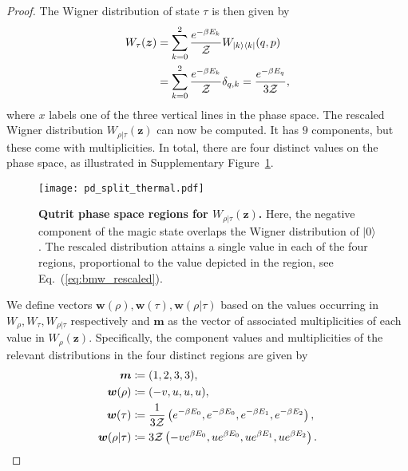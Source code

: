 \documentclass[
twocolumn,
superscriptaddress
]{revtex4-1}
\def\>{\rangle}
\def\<{\langle}
\def\z{\boldsymbol{z}}
\def\w{\boldsymbol{w}}
\def\m{\boldsymbol{m}}
\def\Z{{\cal Z}}
\begin{document}
\begin{proof}
The Wigner distribution of state $\tau$ is then given by
\begin{align}
	W_{\tau}(\z) &= \sum\limits_{k=0}^2 \frac{e^{-\beta E_k}}{\Z}W_{|k\>\<k|}(q, p) \nonumber\\
	&= \sum\limits_{k=0}^2 \frac{e^{-\beta E_k}}{\Z} \delta_{q, k} = \frac{e^{-\beta E_q}}{3\Z},
\end{align}
where $x$ labels one of the three vertical lines in the phase space.
The rescaled Wigner distribution $W_{\rho|\tau}(\z)$ can now be computed. It has $9$ components, but these come with multiplicities. In total, there are four distinct values on the phase space, as illustrated in Supplementary Figure~\ref{fig:pd_split}.
\begin{figure}[h]
    \centering
    \texttt{[image: pd\_split\_thermal.pdf]}
    \caption{\textbf{Qutrit phase space regions for $W_{\rho | \tau}(\z)$.}
    Here, the negative component of the magic state overlaps the Wigner distribution of $|0\>$. The rescaled distribution attains a single value in each of the four regions, proportional to the value depicted in the region, see Eq.~(\ref{eq:bmw_rescaled}).
    }
    \label{fig:pd_split}
\end{figure}

We define vectors $\w(\rho), \w(\tau), \w(\rho|\tau)$ based on the values occurring in $W_\rho, W_\tau, W_{\rho|\tau}$ respectively and $\m$ as the vector of associated multiplicities of each value in $W_\rho(\z)$. Specifically, the component values and multiplicities of the relevant distributions in the four distinct regions are given by
\begin{align}
	\m &\coloneqq (1,2,3,3), \\
	\w(\rho) &\coloneqq (-v, u, u, u), \\
	\w(\tau) &\coloneqq \frac{1}{3\Z} \left( e^{-\beta E_0}, e^{-\beta E_0}, e^{-\beta E_1}, e^{-\beta E_2} \right), \\
	\w(\rho | \tau) &\coloneqq 3\Z \left( -v e^{\beta E_0}, u e^{\beta E_0}, u e^{\beta E_1}, u e^{\beta E_2} \right). \label{eq:bmw_rescaled}
\end{align}


\end{proof}
\end{document}
